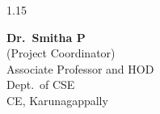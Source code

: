 \begin{spacing}{1.15}
\vspace*{1.5cm}

\begin{center}
\begin{minipage}[t]{0.5\textwidth}
	\centering
	\textbf{Dr.~Smitha P} \\[2pt]
	(Project Coordinator) \\[2pt]
	Associate Professor and HOD \\[2pt]
	Dept.\ of CSE \\[2pt]
	CE, Karunagappally
\end{minipage}
\end{center}

\end{spacing}

\thispagestyle{empty}
